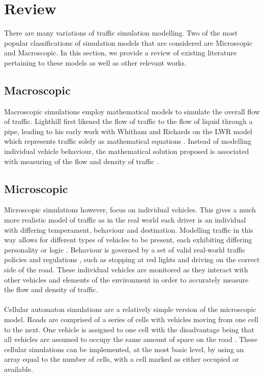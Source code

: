 \section{Review}

There are many variations of traffic simulation modelling. Two of the most popular classifications of simulation models that are considered are Microscopic and Macroscopic. In this section, we provide a review of existing literature pertaining to these models as well as other relevant works. 

\subsection*{Macroscopic}
Macroscopic simulations employ mathematical models to simulate the overall flow of traffic. Lighthill first likened the flow of traffic to the flow of liquid through a pipe, leading to his early work with Whitham and Richards on the LWR model which represents traffic solely as mathematical equations \cite{Lighthill1955Kinetic,Treiber2013Flow,6042479}. Instead of modelling individual vehicle behaviour, the mathematical solution proposed is associated with measuring of the flow and density of traffic \cite{boxill2000evaluation,ehlert2001reactive}. 

\subsection*{Microscopic}
Microscopic simulations however, focus on individual vehicles. This gives a much more realistic model of traffic as in the real world each driver is an individual with differing temperament, behaviour and destination. Modelling traffic in this way allows for different types of vehicles to be present, each exhibiting differing personality or logic \cite{Owen:2000:STS:510378.510542}. Behaviour is governed by a set of valid real-world traffic policies and regulations \cite{Schulze:1997:UTS:268437.268764}, such as stopping at red lights and driving on the correct side of the road.
These individual vehicles are monitored as they interact with other vehicles and elements of the environment in order to accurately measure the flow and density of traffic.

\paragraph{}
Cellular automaton simulations are a relatively simple version of the microscopic model. Roads are comprised of a series of cells with vehicles moving from one cell to the next. One vehicle is assigned to one cell with the disadvantage being that all vehicles are assumed to occupy the same amount of space on the road \cite{Namekawa2005CellAutomaton,6737859}. These cellular simulations can be implemented, at the most basic level, by using an array equal to the number of cells, with a cell marked as either occupied or available.

